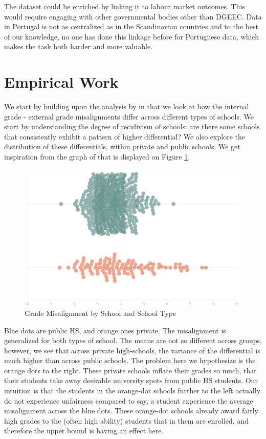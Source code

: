 \documentclass{article}
\begin{document}
The dataset could be enriched by linking it to labour market outcomes. This would require engaging with other governmental bodies other than DGEEC. Data in Portugal is not as centralized as in the Scandinavian countries and to the best of our knowledge, no one has done this linkage before for Portuguese data, which makes the task both harder and more valuable.

\section{Empirical Work}
We start by building upon the analysis by \cite{nata2014unfairness} in that we look at how the internal grade - external grade misalignments differ across different types of schools. We start by understanding the degree of recidivism of schools: are there some schools that consistently exhibit a pattern of higher differential?
We also explore the distribution of these differentials, within private and public schools. We get inspiration from the graph of \cite{sapo2024} that is displayed on Figure \ref{fig:InflationBySchool_Grouped}. 

\begin{figure}[ht]
    \centering
    \includegraphics[width=0.5\linewidth]{Figures/Screenshot 2025-03-07 at 19.18.55.png}
    \caption{Grade Misalignment by School and School Type \citep{sapo2024}}
    \label{fig:InflationBySchool_Grouped}
\end{figure}


Blue dots are public HS, and orange ones private. The misalignment is generalized for both types of school. The means are not so different across groups, however, we see that across private high-schools, the variance of the differential is much higher than across public schools. The problem here we hypothesize is the orange dots to the right. These private schools inflate their grades so much, that their students take away desirable university spots from public HS students. Our intuition is that the students in the orange-dot schools further to the left actually do not experience unfairness compared to say, a student experience the average misalignment across the blue dots. These orange-dot schools already award fairly high grades to the (often high ability) students that in them are enrolled, and therefore the upper bound is having an effect here.
\end{document}
